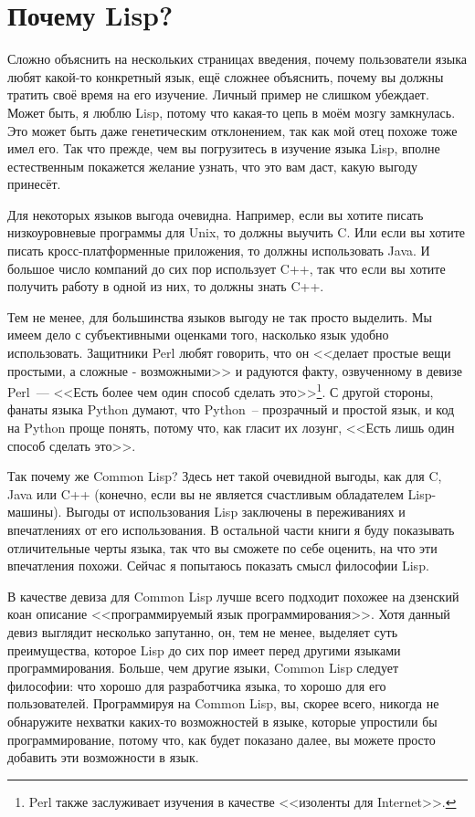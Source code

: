\section{Почему Lisp?}

Сложно объяснить на нескольких страницах введения, почему пользователи языка любят
какой-то конкретный язык, ещё сложнее объяснить, почему вы должны тратить своё время на
его изучение. Личный пример не слишком убеждает. Может быть, я люблю Lisp, потому что
какая-то цепь в моём мозгу замкнулась. Это может быть даже генетическим отклонением, так
как мой отец похоже тоже имел его. Так что прежде, чем вы погрузитесь в изучение языка
Lisp, вполне естественным покажется желание узнать, что это вам даст, какую выгоду
принесёт.

Для некоторых языков выгода очевидна. Например, если вы хотите писать низкоуровневые
программы для Unix, то должны выучить C. Или если вы хотите писать кросс-платформенные
приложения, то должны использовать Java. И большое число компаний до сих пор использует
C++, так что если вы хотите получить работу в одной из них, то должны знать C++.

Тем не менее, для большинства языков выгоду не так просто выделить. Мы имеем дело с
субъективными оценками того, насколько язык удобно использовать. Защитники Perl любят
говорить, что он <<делает простые вещи простыми, а сложные - возможными>> и радуются факту,
озвученному в девизе Perl~--- <<Есть более чем один способ сделать это>>\footnote{Perl
  также заслуживает изучения в качестве <<изоленты для Internet>>.}. С другой стороны,
фанаты языка Python думают, что Python~-- прозрачный и простой язык, и код на Python проще
понять, потому что, как гласит их лозунг, <<Есть лишь один способ сделать это>>.

Так почему же Common Lisp? Здесь нет такой очевидной выгоды, как для C, Java или C++
(конечно, если вы не является счастливым обладателем Lisp-машины). Выгоды от использования
Lisp заключены в переживаниях и впечатлениях от его использования. В остальной части книги
я буду показывать отличительные черты языка, так что вы сможете по себе оценить, на что
эти впечатления похожи. Сейчас я попытаюсь показать смысл философии Lisp.

В качестве девиза для Common Lisp лучше всего подходит похожее на дзенский коан описание
<<программируемый язык программирования>>. Хотя данный девиз выглядит несколько запутанно,
он, тем не менее, выделяет суть преимущества, которое Lisp до сих пор имеет перед другими
языками программирования. Больше, чем другие языки, Common Lisp следует философии: что
хорошо для разработчика языка, то хорошо для его пользователей. Программируя на Common
Lisp, вы, скорее всего, никогда не обнаружите нехватки каких-то возможностей в языке,
которые упростили бы программирование, потому что, как будет показано далее, вы можете
просто добавить эти возможности в язык.


